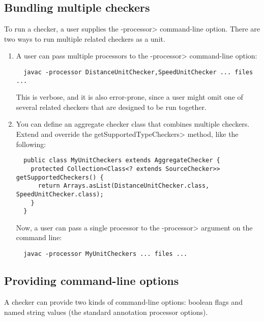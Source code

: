 \subsection{Bundling multiple checkers\label{bundling-multiple-checkers}}

To run a checker, a user supplies the \<-processor> command-line option.
There are two ways to run multiple related checkers as a unit.

\begin{enumerate}
\item
A user can pass
multiple processors to the \<-processor> command-line option:

\begin{Verbatim}
  javac -processor DistanceUnitChecker,SpeedUnitChecker ... files ...
\end{Verbatim}

\noindent
This is verbose, and it is also error-prone, since a user might omit one of
several related checkers that are designed to be run together.

\item
You can define an aggregate checker class that combines
multiple checkers.  Extend  and override
the \<getSupportedTypeCheckers> method, like the following:

\begin{Verbatim}
  public class MyUnitCheckers extends AggregateChecker {
    protected Collection<Class<? extends SourceChecker>> getSupportedCheckers() {
      return Arrays.asList(DistanceUnitChecker.class, SpeedUnitChecker.class);
    }
  }
\end{Verbatim}

\noindent
Now, a user can pass a single processor to the \<-processor> argument on the command line:

\begin{Verbatim}
  javac -processor MyUnitCheckers ... files ...
\end{Verbatim}

\end{enumerate}



\subsection{Providing command-line options\label{providing-command-line-options}}

A checker can provide two kinds of command-line options:
boolean flags and
named string values (the standard annotation processor
options).

